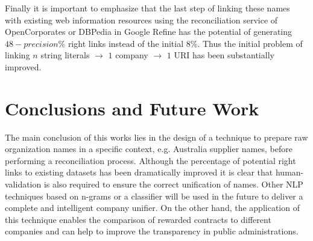 \documentclass{llncs}
\begin{document}
Finally it is important to emphasize that the last step of linking these names 
with existing web information resources using the reconciliation service of 
OpenCorporates or DBPedia in Google Refine has the potential of generating $48-precision$\% right 
links instead of the initial $8$\%. Thus the initial problem of linking $n$ string literals $\to$ 
$1$ company $\to$ $1$ URI has been substantially improved. 

\section{Conclusions and Future Work}
The main conclusion of this works lies in the design of a technique to prepare 
raw organization names in a specific context, e.g. Australia supplier names,  
before performing a reconciliation process. Although the percentage of potential 
right links to existing datasets has been dramatically improved it is clear that 
human-validation is also required to ensure the correct unification of names. 
Other NLP techniques based on n-grams or a classifier will be used in the future 
to deliver a complete and intelligent company unifier. On the other hand, the 
application of this technique enables the comparison of rewarded contracts to 
different companies and can help to improve the transparency in public 
administrations.



\end{document}
